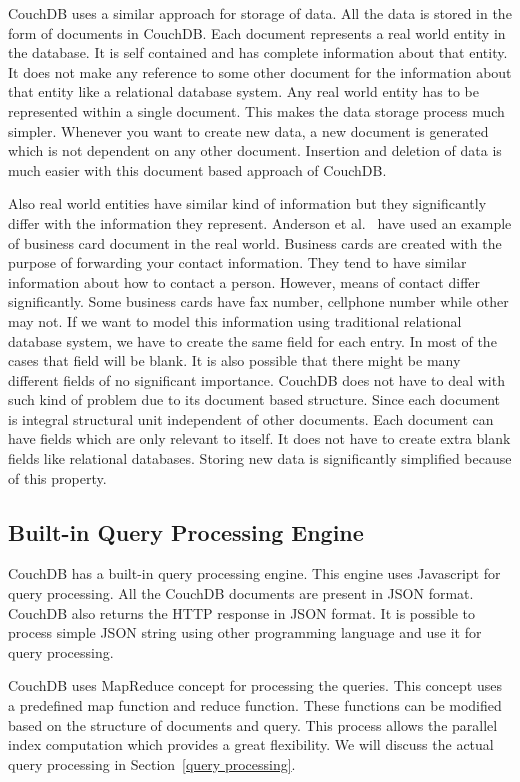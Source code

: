 \documentclass{sig-alternate}
\begin{document}
CouchDB uses a similar approach for storage of data. All the data is stored in the form of documents in CouchDB. Each document represents a real world entity in the database. It is self contained and has complete information about that entity. It does not make any reference to some other document for the information about that entity like a relational database system. Any real world entity has to be represented within a single document. This makes the data storage process much simpler. Whenever you want to create new data, a new document is generated which is not dependent on any other document. Insertion and deletion of data is much easier with this document based approach of CouchDB.

Also real world entities have similar kind of information but they significantly differ with the information they represent. Anderson et al.~\cite{Anderson:CouchDB} have used an example of business card document in the real world. Business cards are created with the purpose of forwarding your contact information. They tend to have similar information about how to contact a person. However, means of contact differ significantly. Some business cards have fax number, cellphone number while other may not. If we want to model this information using traditional relational database system, we have to create the same field for each entry. In most of the cases that field will be blank. It is also possible that there might be many different fields of no significant importance. CouchDB does not have to deal with such kind of problem due to its document based structure. Since each document is integral structural unit independent of other documents. Each document can have fields which are only relevant to itself. It does not have to create extra blank fields like relational databases. Storing new data is significantly simplified because of this property.

\subsection{Built-in Query Processing Engine}
\label{query processing engine}
CouchDB has a built-in query processing engine. This engine uses Javascript for query processing. All the CouchDB documents are present in JSON format. CouchDB also returns the HTTP response in JSON format. It is possible to process simple JSON string using other programming language and use it for query processing.

CouchDB uses MapReduce concept for processing the queries. This concept uses a predefined map function and reduce function. These functions can be modified based on the structure of documents and query. This process allows the parallel index computation which provides a great flexibility. We will discuss the actual query processing in Section~\ref{query processing}.
\end{document}

